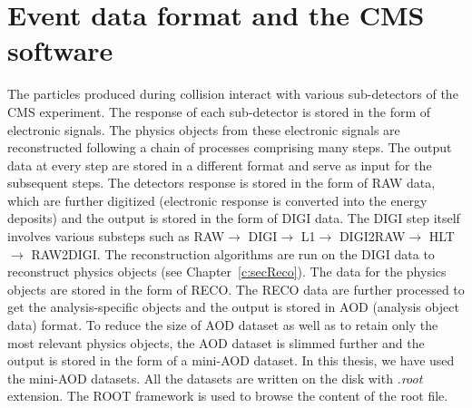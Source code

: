 \section{Event data format and the CMS software}
The particles produced during collision interact with various sub-detectors of 
the CMS experiment. The response of each sub-detector is stored in the form of
electronic signals. The physics objects from these electronic signals are
reconstructed following a chain of processes comprising many steps. The output 
data at every step are stored in a different format and serve as input for the 
subsequent steps. The detectors response is stored in the form of RAW data, which are further digitized (electronic response is converted into the energy 
deposits) and the output is stored in the form of DIGI data. The DIGI step itself 
involves various substeps such as RAW$\rightarrow$ DIGI$\rightarrow$ 
L1$\rightarrow$ DIGI2RAW$\rightarrow$ HLT $\rightarrow$ RAW2DIGI. The 
reconstruction algorithms are run on the DIGI data to reconstruct physics 
objects (see Chapter~\ref{c:secReco}). The data for the physics objects are 
stored in the form of RECO. The RECO data are further processed to get the 
analysis-specific objects and the output is stored in AOD (analysis object data) 
format. To reduce the size of AOD dataset as well as to retain only the most relevant 
physics objects, the AOD dataset is slimmed further and the output is stored in the 
form of a mini-AOD dataset. In this thesis, we have used the mini-AOD datasets. All 
the datasets are written on the disk with {\em .root} extension. The ROOT framework is 
used to browse the content of the root file.

